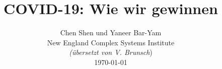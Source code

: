 \documentclass[onecolumn,journal]{IEEEtran}
\begin{document}
\title{\color{Brown} COVID-19: Wie wir gewinnen \\
\vspace{-0.35ex}}
\author{Chen Shen und Yaneer Bar-Yam \\ New England Complex Systems Institute \\
\vspace{+0.35ex}
\small{\textit{(übersetzt von V. Brunsch})}\\
 \today 
  \vspace{-14ex} \\ 

   
\bigskip
\bigskip

\textbf{}
 }
    
\maketitle


\flushbottom %



\thispagestyle{empty} %




\renewcommand{\thefootnote}{\fnsymbol{footnote}}
\end{document}
